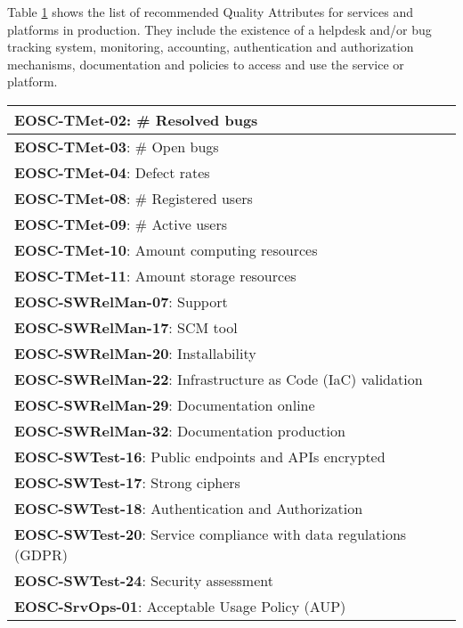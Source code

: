 Table \ref{tab:rs_serviceprod} shows the list of recommended Quality Attributes for services and platforms in production. They include the existence of a helpdesk and/or bug tracking system, monitoring, accounting, authentication and authorization mechanisms, documentation and policies to access and use the service or platform.

\begin{center}
\begin{table}
    \label{tab:rs_serviceprod}
    \small
    \begin{tabular}{|p{\linewidth}|}

        \textbf{EOSC-TMet-02}: \# Resolved bugs \\ \hline
        \textbf{EOSC-TMet-03}: \# Open bugs \\ \hline
        \textbf{EOSC-TMet-04}: Defect rates \\ \hline
        \textbf{EOSC-TMet-08}: \# Registered users \\ \hline
        \textbf{EOSC-TMet-09}: \# Active users \\ \hline
        \textbf{EOSC-TMet-10}: Amount computing resources \\ \hline
        \textbf{EOSC-TMet-11}: Amount storage resources \\ \hline
        \textbf{EOSC-SWRelMan-07}: Support \\ \hline
        \textbf{EOSC-SWRelMan-17}: SCM tool \\ \hline
        \textbf{EOSC-SWRelMan-20}: Installability \\ \hline
        \textbf{EOSC-SWRelMan-22}: Infrastructure as Code (IaC) validation \\ \hline
        \textbf{EOSC-SWRelMan-29}: Documentation online \\ \hline
        \textbf{EOSC-SWRelMan-32}: Documentation production \\ \hline
        \textbf{EOSC-SWTest-16}: Public endpoints and APIs encrypted \\ \hline
        \textbf{EOSC-SWTest-17}: Strong ciphers \\ \hline
        \textbf{EOSC-SWTest-18}: Authentication and Authorization \\ \hline
        \textbf{EOSC-SWTest-20}: Service compliance with data regulations (GDPR) \\ \hline
        \textbf{EOSC-SWTest-24}: Security assessment \\ \hline
        \textbf{EOSC-SrvOps-01}: Acceptable Usage Policy (AUP) \\ \hline

\end{tabular}
\end{table}
\end{center}
